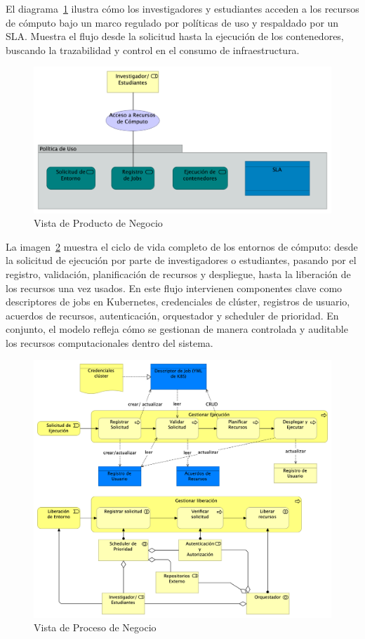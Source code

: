 El diagrama~\ref{fig:vista-productos-negocio} ilustra cómo los investigadores y estudiantes acceden a los recursos de cómputo bajo un marco regulado por políticas de uso y respaldado por un SLA. Muestra el flujo desde la solicitud hasta la ejecución de los contenedores, buscando la trazabilidad y control en el consumo de infraestructura.

\begin{figure}[H]
    \centering
    \includegraphics[width=\textwidth]{tablas-images/cp6/Business-Product-View.png}
    \caption{Vista de Producto de Negocio}\label{fig:vista-productos-negocio}
\end{figure}


La imagen~\ref{fig:vista-proceso-negocio} muestra el ciclo de vida completo de los entornos de cómputo: desde la solicitud de ejecución por parte de investigadores o estudiantes, pasando por el registro, validación, planificación de recursos y despliegue, hasta la liberación de los recursos una vez usados. En este flujo intervienen componentes clave como descriptores de jobs en Kubernetes, credenciales de clúster, registros de usuario, acuerdos de recursos, autenticación, orquestador y scheduler de prioridad. En conjunto, el modelo refleja cómo se gestionan de manera controlada y auditable los recursos computacionales dentro del sistema.
\begin{figure}[H]
    \centering
    \includegraphics[width=\textwidth]{tablas-images/cp6/Business-Process-View.png}
    \caption{Vista de Proceso de Negocio}\label{fig:vista-proceso-negocio}
\end{figure}

